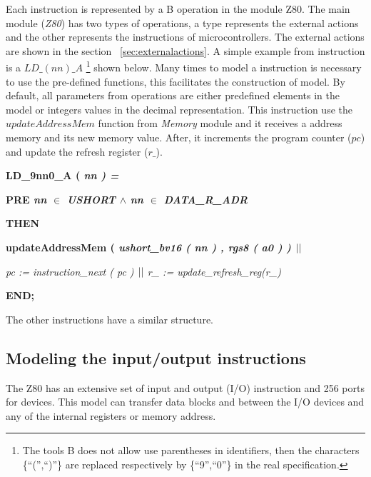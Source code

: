 \documentclass[11pt]{article} %
\newcommand{\footnoteremember}[2]{
  \footnote{#2}
  \newcounter{#1}
  \setcounter{#1}{\value{footnote}}
}
\begin{document}
Each instruction is represented by a B operation in the module Z80. The main module (\textit{Z80}) has two
types of operations, a type represents the external actions and the other represents the instructions of
microcontrollers. The external actions are shown in the section ~\ref{sec:externalactions}.  A simple
example from instruction is a $\mathit{LD\_(nn)\_A}$\footnoteremember{myfootnote}{The tools B does not allow use parentheses in identifiers,
then the characters \{``('',``)''\} are replaced respectively by \{``9'',``0''\} in the real specification.} shown below.
Many times to model a instruction is necessary to use the pre-defined functions, this facilitates the construction of model. By default, all
parameters from operations are either predefined elements in the model or integers values in the decimal
representation. This instruction use the $\mathit{updateAddressMem}$ function from \textit{Memory} module
and it receives a address memory and its new memory value. After, it increments the program counter
($\mathit{pc}$) and update the refresh register ($\mathit{r\_}$).


\hspace*{0.00in}\bf LD\_9nn0\_A \rm ( \it nn \rm ) \rm =

\hspace*{0.20in}\bf PRE \it nn $\in$ \it USHORT\hspace*{0.15in} $\land$ \hspace*{0.10in}\it nn\hspace*{0.10in} $\in$  \it DATA\_R\_ADR

\hspace*{0.20in}\bf THEN

\hspace*{0.20in}\bf updateAddressMem \rm ( \it ushort\_bv16 \rm ( \it nn \rm ) \rm , \it rgs8 \rm ( \it a0 \rm )
\rm )  $\mbox{$\mid\mid$}$

\hspace*{0.20in}\it pc \rm := \it instruction\_next \rm ( \it pc \rm )  $\mbox{$\mid\mid$}$  \it r\_ \rm := \it update\_refresh\_reg\rm (\it r\_\rm )

\hspace*{0.00in}\bf END\rm ;

The other instructions have a similar structure.

\subsection{Modeling the input/output instructions}

The Z80 has an extensive set of input and output (I/O) instruction and 256 ports for
devices. This model can transfer data blocks and between the I/O devices and any
of the internal registers or memory address.
\end{document}

